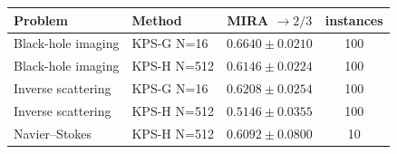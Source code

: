 \begin{tabular}{llcc}
\toprule
Problem & Method & MIRA $\to 2/3$ & instances \\
\midrule
Black-hole imaging & KPS-G N=16 & $0.6640 \pm 0.0210$ & 100 \\
Black-hole imaging & KPS-H N=512 & $0.6146 \pm 0.0224$ & 100 \\
Inverse scattering & KPS-G N=16 & $0.6208 \pm 0.0254$ & 100 \\
Inverse scattering & KPS-H N=512 & $0.5146 \pm 0.0355$ & 100 \\
Navier--Stokes & KPS-H N=512 & $0.6092 \pm 0.0800$ & 10 \\
\bottomrule
\end{tabular}
